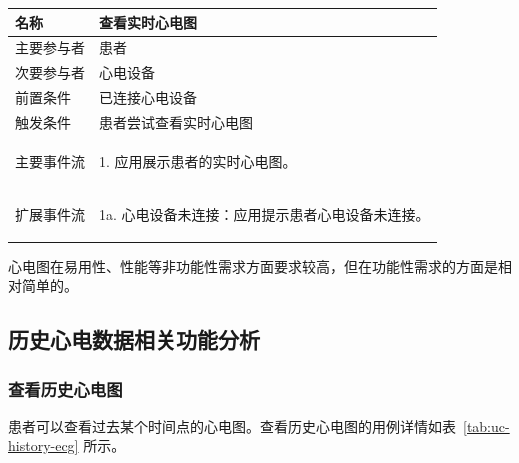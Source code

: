 \begin{table}[!ht]
    \label{tab:uc-real-time-ecg}
    \begin{tabularx}{\textwidth}{|l|X|}
        \hline
        名称    & 查看实时心电图     \\
        \hline
        主要参与者 & 患者          \\
        \hline
        次要参与者 & 心电设备        \\
        \hline
        前置条件  & 已连接心电设备     \\
        \hline
        触发条件  & 患者尝试查看实时心电图 \\
        \hline
        主要事件流 &
        \begin{itemizec}
            \item[1.] 应用展示患者的实时心电图。
        \end{itemizec} \\
        \hline
        扩展事件流 &
        \begin{itemizec}
            \item[1a.] 心电设备未连接：应用提示患者心电设备未连接。
        \end{itemizec} \\
        \hline
    \end{tabularx}
\end{table}

心电图在易用性、性能等非功能性需求方面要求较高，但在功能性需求的方面是相对简单的。

\subsection{历史心电数据相关功能分析}\label{subsec:history-req}

\subsubsection{查看历史心电图}

患者可以查看过去某个时间点的心电图。查看历史心电图的用例详情如表~\ref{tab:uc-history-ecg} 所示。

